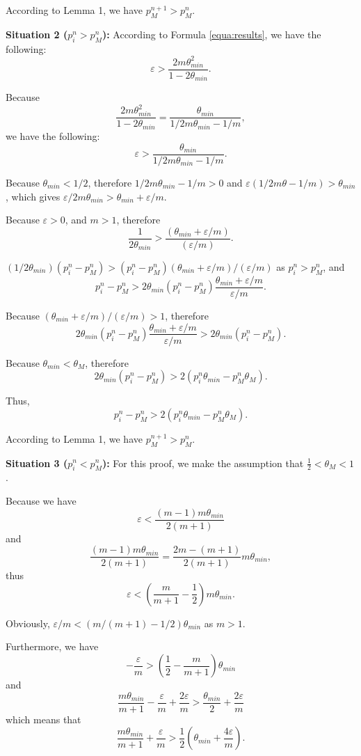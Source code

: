\documentclass[10pt,journal,cspaper,compsoc,onecolumn]{IEEEtran}
\begin{document}
According to Lemma 1, we have $p_M^{n + 1} > p_M^{n}$.

\textbf{Situation 2 ($p_i^n > p_M^n$):} According to Formula \ref{equa:results}, we have the following:
$$\varepsilon > \displaystyle\frac{2m\theta_{min}^2}{1-2\theta_{min}}.$$

Because
$$\displaystyle\frac{2m\theta_{min}^2}{1-2\theta_{min}} = \displaystyle\frac{\theta_{min}}{1/2m\theta_{min} - 1/m},$$
we have the following:
$$\varepsilon > \displaystyle\frac{\theta_{min}}{1/2m\theta_{min} - 1/m}.$$

Because $\theta_{min} < 1/2$, therefore
$1/2m\theta_{min} - 1/m > 0$ and
$\varepsilon(1/2m\theta - 1/m) > \theta_{min}$, which gives
$\varepsilon/2m\theta_{min} > \theta_{min} + \varepsilon/m$.

Because $\varepsilon > 0$, and $m > 1$, therefore
 $$\displaystyle\frac{1}{2\theta_{min}} > \displaystyle\frac{(\theta_{min} + \varepsilon/m)}{(\varepsilon/m)}.$$

$(1/2\theta_{min})(p_i^n - p_M^n) > (p_i^n - p_M^n)(\theta_{min} + \varepsilon/m)/(\varepsilon/m)$ as
$p_i^n > p_M^n$, and
$$p_i^n -p_M^n > 2\theta_{min}(p_i^n -p_M^n)\displaystyle\frac{\theta_{min} + \varepsilon/m}{\varepsilon/m}.$$

Because $(\theta_{min} + \varepsilon/m)/(\varepsilon/m) > 1$, therefore
$$2\theta_{min}(p_i^n -p_M^n)\displaystyle\frac{\theta_{min} + \varepsilon/m}{\varepsilon/m} > 2\theta_{min}(p_i^n -p_M^n).$$

Because $\theta_{min} < \theta_M$, therefore
$$2\theta_{min}(p_i^n - p_M^n) > 2(p_i^n\theta_{min} - p_M^n\theta_M).$$

Thus,
$$p_i^n -p_M^n > 2(p_i^n\theta_{min} - p_M^n\theta_M).$$

According to Lemma 1, we have $p_M^{n + 1} > p_M^{n}$.

\textbf{Situation 3 ($p_i^n < p_M^n$):}
For this proof, we make the assumption that $\frac{1}{2} < \theta_M < 1$.

Because we have
$$\varepsilon < \displaystyle\frac{(m - 1)m\theta_{min}}{2(m + 1)}$$
and
$$\displaystyle\frac{(m - 1)m\theta_{min}}{2(m + 1)} = \displaystyle\frac{2m -(m + 1)}{2(m + 1)}m\theta_{min},$$
thus
$$\varepsilon < (\displaystyle\frac{m}{m +1} - \displaystyle\frac{1}{2})m\theta_{min}.$$

Obviously, $\varepsilon/m < (m/(m + 1) - 1/2)\theta_{min}$ as $m > 1$.

Furthermore, we have
$$-\displaystyle\frac{\varepsilon}{m} > (\displaystyle\frac{1}{2} - \displaystyle\frac{m}{m + 1})\theta_{min}$$
and
$$\displaystyle\frac{m\theta_{min}}{m + 1} - \displaystyle\frac{\varepsilon}{m} + \displaystyle\frac{2\varepsilon}{m} > \displaystyle\frac{\theta_{min}}{2} + \displaystyle\frac{2\varepsilon}{m}$$
which means that
$$\displaystyle\frac{m\theta_{min}}{m + 1} + \displaystyle\frac{\varepsilon}{m}  > \displaystyle\frac{1}{2}(\theta_{min} + \displaystyle\frac{4\varepsilon}{m}).$$
\end{document}

